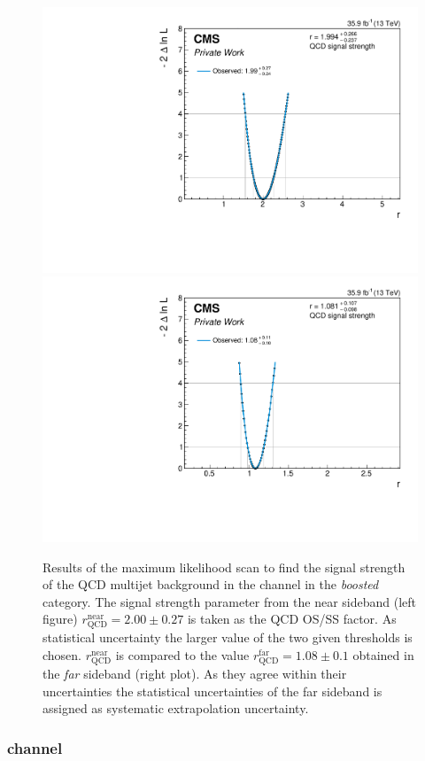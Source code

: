 \begin{figure}[h!]
    \centering
    \includegraphics[width=.49\textwidth]{Figures/background_estimation/RQCDOSSS/Scans/et_dijet2D_antiiso_near/plots/nll.pdf}
    \includegraphics[width=.49\textwidth]{Figures/background_estimation/RQCDOSSS/Scans/et_dijet2D_antiiso_far/plots/nll.pdf}
    \caption[Results of the maximum likelihood scan for $R_\text{QCD}^\text{OS/SS}$ in the \etau{} channel for the \textit{dijet} category.]{Results of the maximum likelihood scan to find the signal strength of the QCD multijet background in the \etau channel in the \textit{boosted} category.
    The signal strength parameter from the near sideband (left figure) $r^{\text{near}}_\text{QCD} = 2.00\pm 0.27$ is taken as the QCD OS/SS factor. As statistical uncertainty the larger value of the two given thresholds is chosen. 
    $r^{\text{near}}_\text{QCD}$ is compared to the value $r^{\text{far}}_\text{QCD} = 1.08\pm 0.1$ obtained in the \textit{far} sideband (right plot). As they agree within their uncertainties the statistical uncertainties of the far sideband is assigned as systematic extrapolation uncertainty.}\label{SUPPLE:BK:Scans:et_2jet}
\end{figure}

\subsubsection{\mutau{} channel}

